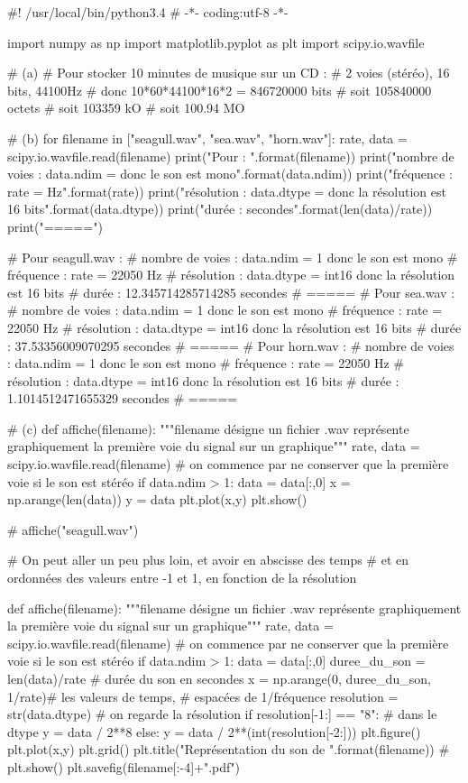 \documentclass[10pt,fleqn]{article} %
\begin{document}
\ifprof 
\begin{corrige}
\begin{python}
#! /usr/local/bin/python3.4
# -*- coding:utf-8 -*-

import numpy as np
import matplotlib.pyplot as plt
import scipy.io.wavfile

# (a)
# Pour stocker 10 minutes de musique sur un CD : 
# 2 voies (stéréo), 16 bits, 44100Hz
# donc 10*60*44100*16*2 = 846720000 bits
# soit 105840000 octets
# soit 103359 kO
# soit 100.94 MO

# (b)
for filename in ["seagull.wav", "sea.wav", "horn.wav"]:
    rate, data = scipy.io.wavfile.read(filename)
    print("Pour {} : ".format(filename))
    print("nombre de voies : data.ndim = {} donc le son est mono".format(data.ndim))
    print("fréquence : rate = {} Hz".format(rate))
    print("résolution : data.dtype = {} donc la résolution est 16 bits".format(data.dtype))
    print("durée : {} secondes".format(len(data)/rate))
    print("=====")

# Pour seagull.wav : 
# nombre de voies : data.ndim = 1 donc le son est mono
# fréquence : rate = 22050 Hz
# résolution : data.dtype = int16 donc la résolution est 16 bits
# durée : 12.345714285714285 secondes
# =====
# Pour sea.wav : 
# nombre de voies : data.ndim = 1 donc le son est mono
# fréquence : rate = 22050 Hz
# résolution : data.dtype = int16 donc la résolution est 16 bits
# durée : 37.53356009070295 secondes
# =====
# Pour horn.wav : 
# nombre de voies : data.ndim = 1 donc le son est mono
# fréquence : rate = 22050 Hz
# résolution : data.dtype = int16 donc la résolution est 16 bits
# durée : 1.1014512471655329 secondes
# =====
    
# (c)
def affiche(filename):
    """filename désigne un fichier .wav
    représente graphiquement la première voie du signal sur un graphique"""
    rate, data = scipy.io.wavfile.read(filename)
    # on commence par ne conserver que la première voie si le son est stéréo
    if data.ndim > 1:
        data = data[:,0]
    x = np.arange(len(data))
    y = data
    plt.plot(x,y)
    plt.show()        

# affiche("seagull.wav")    

# On peut aller un peu plus loin, et avoir en abscisse des temps
# et en ordonnées des valeurs entre -1 et 1, en fonction de la résolution

def affiche(filename):
    """filename désigne un fichier .wav
    représente graphiquement la première voie du signal sur un graphique"""
    rate, data = scipy.io.wavfile.read(filename)
    # on commence par ne conserver que la première voie si le son est stéréo
    if data.ndim > 1:
        data = data[:,0]
    duree_du_son = len(data)/rate         # durée du son en secondes
    x = np.arange(0, duree_du_son, 1/rate)# les valeurs de temps,
                                          # espacées de 1/fréquence
    resolution = str(data.dtype)          # on regarde la résolution 
    if resolution[-1:] == "8":            # dans le dtype
        y = data / 2**8
    else:
        y = data / 2**(int(resolution[-2:]))
    plt.figure()
    plt.plot(x,y)
    plt.grid()
    plt.title("Représentation du son de {}".format(filename))
    # plt.show()
    plt.savefig(filename[:-4]+".pdf")


\end{python}
\end{corrige}
\end{document}
